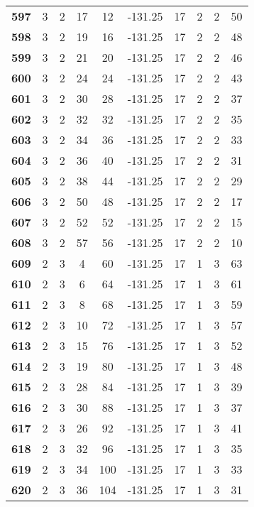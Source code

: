 \documentclass{article}%
\begin{document}
\begin{longtable}{cccccccccc}
        \textbf{597} & 3 & 2 & 17 & 12 & -131.25 & 17 & 2 & 2 & 50 \\ 
        \textbf{598} & 3 & 2 & 19 & 16 & -131.25 & 17 & 2 & 2 & 48 \\ 
        \textbf{599} & 3 & 2 & 21 & 20 & -131.25 & 17 & 2 & 2 & 46 \\ 
        \textbf{600} & 3 & 2 & 24 & 24 & -131.25 & 17 & 2 & 2 & 43 \\ 
        \textbf{601} & 3 & 2 & 30 & 28 & -131.25 & 17 & 2 & 2 & 37 \\ 
        \textbf{602} & 3 & 2 & 32 & 32 & -131.25 & 17 & 2 & 2 & 35 \\ 
        \textbf{603} & 3 & 2 & 34 & 36 & -131.25 & 17 & 2 & 2 & 33 \\ 
        \textbf{604} & 3 & 2 & 36 & 40 & -131.25 & 17 & 2 & 2 & 31 \\ 
        \textbf{605} & 3 & 2 & 38 & 44 & -131.25 & 17 & 2 & 2 & 29 \\ 
        \textbf{606} & 3 & 2 & 50 & 48 & -131.25 & 17 & 2 & 2 & 17 \\ 
        \textbf{607} & 3 & 2 & 52 & 52 & -131.25 & 17 & 2 & 2 & 15 \\ 
        \textbf{608} & 3 & 2 & 57 & 56 & -131.25 & 17 & 2 & 2 & 10 \\ 
        \textbf{609} & 2 & 3 & 4 & 60 & -131.25 & 17 & 1 & 3 & 63 \\ 
        \textbf{610} & 2 & 3 & 6 & 64 & -131.25 & 17 & 1 & 3 & 61 \\ 
        \textbf{611} & 2 & 3 & 8 & 68 & -131.25 & 17 & 1 & 3 & 59 \\ 
        \textbf{612} & 2 & 3 & 10 & 72 & -131.25 & 17 & 1 & 3 & 57 \\ 
        \textbf{613} & 2 & 3 & 15 & 76 & -131.25 & 17 & 1 & 3 & 52 \\ 
        \textbf{614} & 2 & 3 & 19 & 80 & -131.25 & 17 & 1 & 3 & 48 \\ 
        \textbf{615} & 2 & 3 & 28 & 84 & -131.25 & 17 & 1 & 3 & 39 \\ 
        \textbf{616} & 2 & 3 & 30 & 88 & -131.25 & 17 & 1 & 3 & 37 \\ 
        \textbf{617} & 2 & 3 & 26 & 92 & -131.25 & 17 & 1 & 3 & 41 \\ 
        \textbf{618} & 2 & 3 & 32 & 96 & -131.25 & 17 & 1 & 3 & 35 \\ 
        \textbf{619} & 2 & 3 & 34 & 100 & -131.25 & 17 & 1 & 3 & 33 \\ 
        \textbf{620} & 2 & 3 & 36 & 104 & -131.25 & 17 & 1 & 3 & 31 \\ 

\end{longtable}
\end{document}
